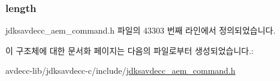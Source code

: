 \subsubsection[{\texorpdfstring{length}{length}}]{ length}\hypertarget{structjdksavdecc__aem__command__set__memory__object__length__response_a190b76b1f3d5bd26920300e5f073739b}{}\label{structjdksavdecc__aem__command__set__memory__object__length__response_a190b76b1f3d5bd26920300e5f073739b}


jdksavdecc\+\_\+aem\+\_\+command.\+h 파일의 43303 번째 라인에서 정의되었습니다.



이 구조체에 대한 문서화 페이지는 다음의 파일로부터 생성되었습니다.\+:\begin{DoxyCompactItemize}
\item 
avdecc-\/lib/jdksavdecc-\/c/include/\hyperlink{jdksavdecc__aem__command_8h}{jdksavdecc\+\_\+aem\+\_\+command.\+h}\end{DoxyCompactItemize}
